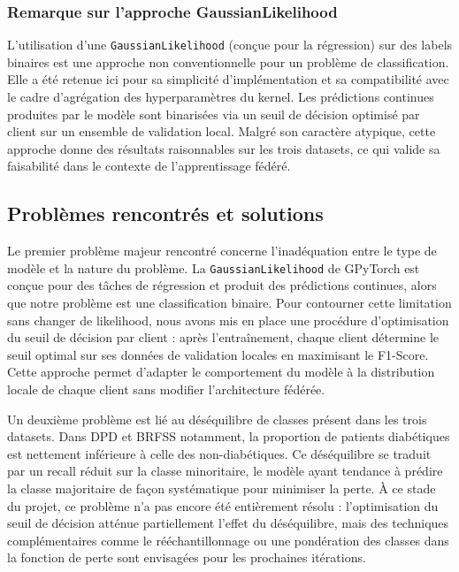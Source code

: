 \documentclass[12pt,a4paper]{article}
\begin{document}
\subsubsection*{Remarque sur l'approche GaussianLikelihood}

L'utilisation d'une \texttt{GaussianLikelihood} (conçue pour la régression) sur des labels binaires est une approche non conventionnelle pour un problème de classification. Elle a été retenue ici pour sa simplicité d'implémentation et sa compatibilité avec le cadre d'agrégation des hyperparamètres du kernel. Les prédictions continues produites par le modèle sont binarisées via un seuil de décision optimisé par client sur un ensemble de validation local. Malgré son caractère atypique, cette approche donne des résultats raisonnables sur les trois datasets, ce qui valide sa faisabilité dans le contexte de l'apprentissage fédéré.


\subsection{Problèmes rencontrés et solutions}

Le premier problème majeur rencontré concerne l'inadéquation entre le type de modèle et la nature du problème. La \texttt{GaussianLikelihood} de GPyTorch est conçue pour des tâches de régression et produit des prédictions continues, alors que notre problème est une classification binaire. Pour contourner cette limitation sans changer de likelihood, nous avons mis en place une procédure d'optimisation du seuil de décision par client : après l'entraînement, chaque client détermine le seuil optimal sur ses données de validation locales en maximisant le F1-Score. Cette approche permet d'adapter le comportement du modèle à la distribution locale de chaque client sans modifier l'architecture fédérée.

Un deuxième problème est lié au déséquilibre de classes présent dans les trois datasets. Dans DPD et BRFSS notamment, la proportion de patients diabétiques est nettement inférieure à celle des non-diabétiques. Ce déséquilibre se traduit par un recall réduit sur la classe minoritaire, le modèle ayant tendance à prédire la classe majoritaire de façon systématique pour minimiser la perte. À ce stade du projet, ce problème n'a pas encore été entièrement résolu : l'optimisation du seuil de décision atténue partiellement l'effet du déséquilibre, mais des techniques complémentaires comme le rééchantillonnage ou une pondération des classes dans la fonction de perte sont envisagées pour les prochaines itérations.
\end{document}
